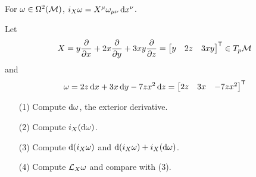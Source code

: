 \documentclass[a4paper, 10pt]{article}
\begin{document}
\begin{remark}
    For $\omega \in \Omega^{2}(\mathcal{M})$, $i_{X}\omega = X^{\mu}\omega_{\mu\nu}\,\mathrm{d}{x}^{\nu}$.
\end{remark}

\begin{exer}
    Let
    \[ X = y\frac{\partial}{\partial{x}} + 2x\frac{\partial}{\partial{y}} + 3xy\frac{\partial}{\partial{z}} = \begin{bmatrix}y & 2z & 3xy\end{bmatrix}^{\mathsf{T}} \in T_{p}\mathcal{M} \]
    and
    \[ \omega = 2z\,\mathrm{d}{x} + 3x\,\mathrm{d}{y} - 7zx^{2}\,\mathrm{d}{z} = \begin{bmatrix}2z & 3x & -7zx^{2}\end{bmatrix}^{\mathsf{T}} \]
    \begin{itemize}
        \item[(1)] Compute $\mathrm{d}\omega$, the exterior derivative.
        \item[(2)] Compute $i_{X}(\mathrm{d}\omega)$.
        \item[(3)] Compute $\mathrm{d}(i_{X}\omega)$ and $\mathrm{d}(i_{X}\omega) + i_{X}(\mathrm{d}\omega)$.
        \item[(4)] Compute $\mathcal{L}_{X}\omega$ and compare with (3).
    \end{itemize}
\end{exer}
\newpage

\end{document}
